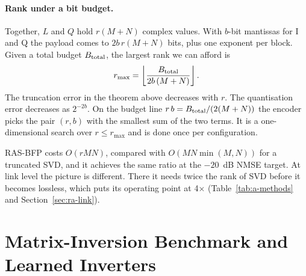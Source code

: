 \paragraph{Rank under a bit budget.} Together, $L$ and $Q$ hold $r(M+N)$ complex values. With $b$-bit mantissas for I and Q the payload comes to $2b\,r(M+N)$ bits, plus one exponent per block. Given a total budget $B_{\rm total}$, the largest rank we can afford is
\begin{equation}
  r_{\max} = \left\lfloor \frac{B_{\rm total}}{2b\,(M+N)} \right\rfloor .
\end{equation}
The truncation error in the theorem above decreases with $r$. The quantisation error decreases as $2^{-2b}$. On the budget line $r\,b = B_{\rm total}/(2(M+N))$ the encoder picks the pair $(r, b)$ with the smallest sum of the two terms. It is a one-dimensional search over $r \le r_{\max}$ and is done once per configuration.

RAS-BFP costs $O(rMN)$, compared with $O(MN\min(M,N))$ for a truncated SVD, and it achieves the same ratio at the $-20$~dB NMSE target. At link level the picture is different. There it needs twice the rank of SVD before it becomes lossless, which puts its operating point at 4$\times$ (Table~\ref{tab:a-methods} and Section~\ref{sec:ra-link}).

\begin{table}[H]
\caption{IQ compression methods compared in Part~A.}
\label{tab:a-methods}
\centering
{}
\end{table}

\section{Matrix-Inversion Benchmark and Learned Inverters}
\label{sec:a-bench}

